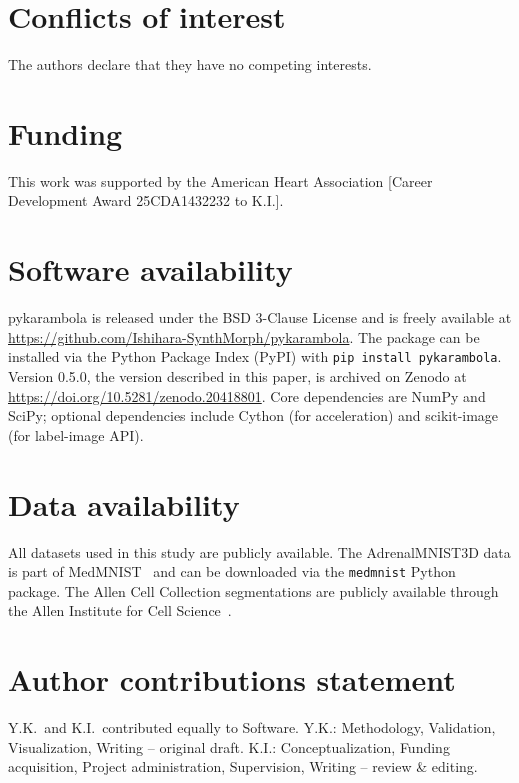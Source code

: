 \documentclass[unnumsec,webpdf,contemporary,large,namedate]{oup-authoring-template}
\begin{document}
\section{Conflicts of interest}
The authors declare that they have no competing interests.

\section{Funding}
This work was supported by the American Heart Association [Career Development Award 25CDA1432232 to K.I.].

\section{Software availability}
pykarambola is released under the BSD 3-Clause License and is freely available at \url{https://github.com/Ishihara-SynthMorph/pykarambola}.
The package can be installed via the Python Package Index (PyPI) with \texttt{pip install pykarambola}.
Version 0.5.0, the version described in this paper, is archived on Zenodo at \url{https://doi.org/10.5281/zenodo.20418801}.
Core dependencies are NumPy and SciPy; optional dependencies include Cython (for acceleration) and scikit-image (for label-image API).

\section{Data availability}
All datasets used in this study are publicly available.
The AdrenalMNIST3D data is part of MedMNIST~\citep{Yang2023MedMNIST} and can be downloaded via the \texttt{medmnist} Python package.
The Allen Cell Collection segmentations are publicly available through the Allen Institute for Cell Science~\citep{viana2023integrated}.

\section{Author contributions statement}
Y.K.\ and K.I.\ contributed equally to Software.
Y.K.: Methodology, Validation, Visualization, Writing -- original draft.
K.I.: Concep\-tualization, Funding acquisition, Project administration, Supervision, Writing -- review \& editing.
\end{document}
